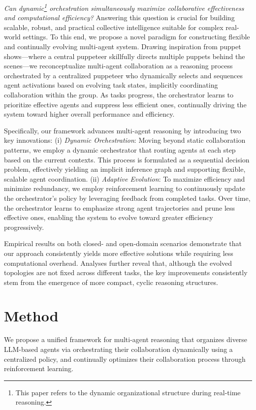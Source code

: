 \documentclass{article}
\begin{document}
\emph{Can dynamic\footnote{This paper refers to the dynamic organizational structure during real-time reasoning.} orchestration simultaneously maximize collaborative effectiveness and computational efficiency?}
Answering this question is crucial for building scalable, robust, and practical collective intelligence suitable for complex real-world settings.
To this end, we propose a novel paradigm for constructing flexible and continually evolving multi-agent system. Drawing inspiration from puppet shows—where a central puppeteer skillfully directs multiple puppets behind the scenes—we reconceptualize multi-agent collaboration as a reasoning process orchestrated by a centralized puppeteer who dynamically selects and sequences agent activations based on evolving task states, implicitly coordinating collaboration within the group. As tasks progress, the orchestrator learns to prioritize effective agents and suppress less efficient ones, continually driving the system toward higher overall performance and efficiency.

Specifically, our framework advances multi-agent reasoning by introducing two key innovations:
(i) \emph{Dynamic Orchestration}: Moving beyond static collaboration patterns, we employ a dynamic orchestrator that routing agents at each step based on the current contexts. This process is formulated as a sequential decision problem, effectively yielding an implicit inference graph and supporting flexible, scalable agent coordination.
(ii) \emph{Adaptive Evolution}: To maximize efficiency and minimize redundancy, we employ reinforcement learning to continuously update the orchestrator's policy by leveraging feedback from completed tasks. Over time, the orchestrator learns to emphasize strong agent trajectories and prune less effective ones, enabling the system to evolve toward greater efficiency progressively.

Empirical results on both closed- and open-domain scenarios demonstrate that our approach consistently yields more effective solutions while requiring less computational overhead. 
Analyses further reveal that, although the evolved topologies are not fixed across different tasks, the key improvements consistently stem from the emergence of more compact, cyclic reasoning structures.


\section{Method}
We propose a unified framework for multi-agent reasoning that organizes diverse LLM-based agents via orchestrating their collaboration dynamically using a centralized policy, and continually optimizes their collaboration process through reinforcement learning.
\end{document}
